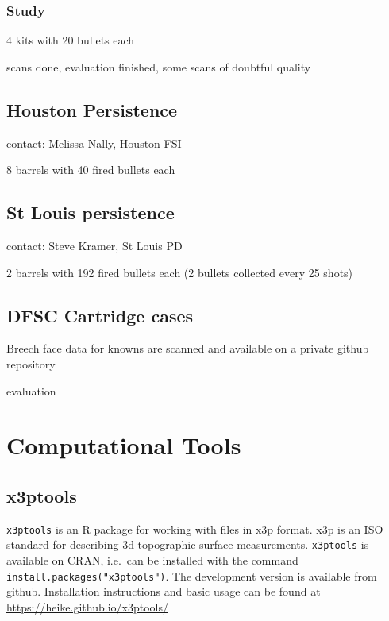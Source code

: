 \documentclass[]{book}
\begin{document}
\hypertarget{study}{%
\subsubsection{Study}\label{study}}

4 kits with 20 bullets each

scans done, evaluation finished, some scans of doubtful quality

\hypertarget{houston-persistence}{%
\subsection{Houston Persistence}\label{houston-persistence}}

contact: Melissa Nally, Houston FSI

8 barrels with 40 fired bullets each

\hypertarget{st-louis-persistence}{%
\subsection{St Louis persistence}\label{st-louis-persistence}}

contact: Steve Kramer, St Louis PD

2 barrels with 192 fired bullets each (2 bullets collected every 25 shots)

\hypertarget{dfsc-cartridge-cases}{%
\subsection{DFSC Cartridge cases}\label{dfsc-cartridge-cases}}

Breech face data for knowns are scanned and available on a private github repository

evaluation

\hypertarget{computational-tools}{%
\section{Computational Tools}\label{computational-tools}}

\hypertarget{x3ptools}{%
\subsection{x3ptools}\label{x3ptools}}

\texttt{x3ptools} is an R package for working with files in x3p format. x3p is an ISO standard for describing 3d topographic surface measurements.
\texttt{x3ptools} is available on CRAN, i.e.~can be installed with the command \texttt{install.packages("x3ptools")}. The development version is available from github. Installation instructions and basic usage can be found at \url{https://heike.github.io/x3ptools/}
\end{document}
